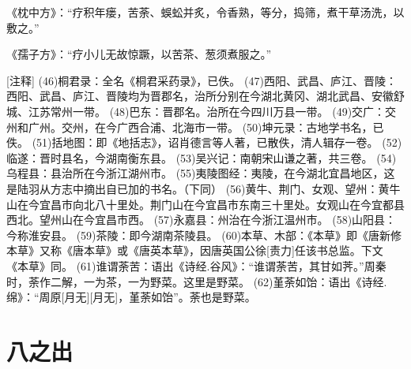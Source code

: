 \documentclass[12pt,UTF8]{ctexbook}
\begin{document}
《枕中方》：“疗积年瘘，苦荼、蜈蚣并炙，令香熟，等分，捣筛，煮干草汤洗，以敷之。”

《孺子方》：“疗小儿无故惊蹶，以苦茶、葱须煮服之。”

[注释]
(46)桐君录：全名《桐君采药录》，已佚。
(47)西阳、武昌、庐江、晋陵：西阳、武昌、庐江、晋陵均为晋郡名，治所分别在今湖北黄冈、湖北武昌、安徽舒城、江苏常州一带。
(48)巴东：晋郡名。治所在今四川万县一带。
(49)交广：交州和广州。交州，在今广西合浦、北海市一带。
(50)坤元录：古地学书名，已佚。
(51)括地图：即《地括志》，诏肖德言等人著，已散佚，清人辑存一卷。
(52)临遂：晋时县名，今湖南衡东县。
(53)吴兴记：南朝宋山谦之著，共三卷。
(54)乌程县：县治所在今浙江湖州市。
(55)夷陵图经：夷陵，在今湖北宜昌地区，这是陆羽从方志中摘出自已加的书名。（下同）
(56)黄牛、荆门、女观、望州：黄牛山在今宜昌市向北八十里处。荆门山在今宜昌市东南三十里处。女观山在今宜都县西北。望州山在今宜昌市西。
(57)永嘉县：州治在今浙江温州市。
(58)山阳县：今称淮安县。
(59)茶陵：即今湖南茶陵县。
(60)本草、木部：《本草》即《唐新修本草》又称《唐本草》或《唐英本草》，因唐英国公徐[责力]任该书总监。下文《本草》同。
(61)谁谓荼苦：语出《诗经.谷风》：“谁谓荼苦，其甘如荠。”周秦时，荼作二解，一为茶，一为野菜。这里是野菜。
(62)堇荼如饴：语出《诗经.绵》：“周原[月无][月无]，堇荼如饴”。荼也是野菜。

\chapter{八之出}
\end{document}
